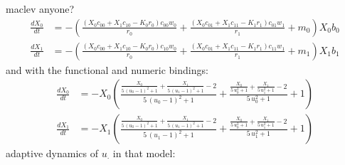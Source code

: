 \documentclass{article}
\begin{document}
maclev anyone? 
\[\begin{align*}
\frac{dX_{0}}{dt} &= -{\left(\frac{{\left(X_{0} c_{00} + X_{1} c_{10} - K_{0} r_{0}\right)} c_{00} w_{0}}{r_{0}} + \frac{{\left(X_{0} c_{01} + X_{1} c_{11} - K_{1} r_{1}\right)} c_{01} w_{1}}{r_{1}} + m_{0}\right)} X_{0} b_{0}\\
\frac{dX_{1}}{dt} &= -{\left(\frac{{\left(X_{0} c_{00} + X_{1} c_{10} - K_{0} r_{0}\right)} c_{10} w_{0}}{r_{0}} + \frac{{\left(X_{0} c_{01} + X_{1} c_{11} - K_{1} r_{1}\right)} c_{11} w_{1}}{r_{1}} + m_{1}\right)} X_{1} b_{1}
\end{align*}\]
and with the functional and numeric bindings: 
\[\begin{align*}
\frac{dX_{0}}{dt} &= -X_{0} {\left(\frac{\frac{X_{0}}{5 \, {\left(u_{0} - 1\right)}^{2} + 1} + \frac{X_{1}}{5 \, {\left(u_{1} - 1\right)}^{2} + 1} - 2}{5 \, {\left(u_{0} - 1\right)}^{2} + 1} + \frac{\frac{X_{0}}{5 \, u_{0}^{2} + 1} + \frac{X_{1}}{5 \, u_{1}^{2} + 1} - 2}{5 \, u_{0}^{2} + 1} + 1\right)}\\
\frac{dX_{1}}{dt} &= -X_{1} {\left(\frac{\frac{X_{0}}{5 \, {\left(u_{0} - 1\right)}^{2} + 1} + \frac{X_{1}}{5 \, {\left(u_{1} - 1\right)}^{2} + 1} - 2}{5 \, {\left(u_{1} - 1\right)}^{2} + 1} + \frac{\frac{X_{0}}{5 \, u_{0}^{2} + 1} + \frac{X_{1}}{5 \, u_{1}^{2} + 1} - 2}{5 \, u_{1}^{2} + 1} + 1\right)}
\end{align*}\]
adaptive dynamics of $u_\cdot$ in that model:
\end{document}
